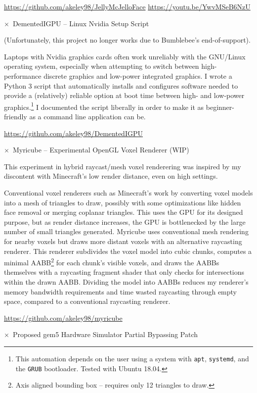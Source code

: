 \documentclass[11pt]{article}
\newcommand{\web}[1]{{ \color{webColor} \small \url{#1}}}
\newcommand{\mySub}[1]{{\color{subColor}\hspace{-6mm} \( \times \)\ \textsf{#1}}}
\begin{document}
\web{https://github.com/akeley98/JellyMcJelloFace}
\hfill\web{https://youtu.be/YwvMSeB6NzU}

\mySub{DementedIGPU -- Linux Nvidia Setup Script}

(Unfortunately, this project no longer works due to Bumblebee's
end-of-support).

Laptops with Nvidia graphics cards often work unreliably with the
GNU/Linux operating system, especially when attempting to switch
between high-performance discrete graphics and low-power integrated
graphics. I wrote a Python 3 script that automatically installs and
configures software needed to provide a (relatively) reliable option
at boot time between high- and low-power graphics.\footnote{This
  automation depends on the user using a system with \texttt{apt},
  \texttt{systemd}, and the \texttt{GRUB} bootloader. Tested with
  Ubuntu 18.04.} I documented the script liberally in order to make it
as beginner-friendly as a command line application can be.

\web{https://github.com/akeley98/DementedIGPU}

\mySub{Myricube -- Experimental OpenGL Voxel Renderer (WIP)}

This experiment in hybrid raycast/mesh voxel renderering was inspired
by my discontent with Minecraft's low render distance, even on high
settings.

Conventional voxel renderers such as Minecraft's work by converting
voxel models into a mesh of triangles to draw, possibly with some
optimizations like hidden face removal or merging coplanar
triangles. This uses the GPU for its designed purpose, but as render
distance increases, the GPU is bottlenecked by the large number of
small triangles generated. Myricube uses conventional mesh rendering
for nearby voxels but draws more distant voxels with an alternative
raycasting renderer. This renderer subdivides the voxel model into
cubic chunks, computes a minimal AABB\footnote{Axis aligned bounding
  box -- requires only 12 triangles to draw.} for each chunk's visible
voxels, and draws the AABBs themselves with a raycasting fragment
shader that only checks for intersections within the drawn AABB.
Dividing the model into AABBs reduces my renderer's memory bandwidth
requirements and time wasted raycasting through empty space, compared
to a conventional raycasting renderer.

\web{https://github.com/akeley98/myricube}

\mySub{Proposed gem5 Hardware Simulator Partial Bypassing Patch}
\end{document}
